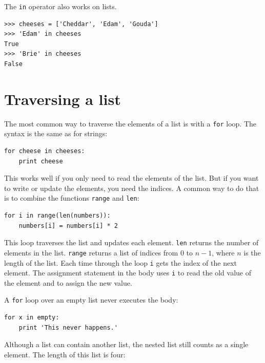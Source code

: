 \documentclass[10pt]{book}
\begin{document}



The {\tt in} operator also works on lists.

\beforeverb
\begin{verbatim}
>>> cheeses = ['Cheddar', 'Edam', 'Gouda']
>>> 'Edam' in cheeses
True
>>> 'Brie' in cheeses
False
\end{verbatim}
\afterverb


\section{Traversing a list}

The most common way to traverse the elements of a list is
with a {\tt for} loop.  The syntax is the same as for strings:

\beforeverb
\begin{verbatim}
for cheese in cheeses:
    print cheese
\end{verbatim}
\afterverb
%
This works well if you only need to read the elements of the
list.  But if you want to write or update the elements, you
need the indices.  A common way to do that is to combine
the functions {\tt range} and {\tt len}:


\beforeverb
\begin{verbatim}
for i in range(len(numbers)):
    numbers[i] = numbers[i] * 2
\end{verbatim}
\afterverb
%
This loop traverses the list and updates each element.  {\tt len}
returns the number of elements in the list.  {\tt range} returns
a list of indices from 0 to $n-1$, where $n$ is the length of
the list.  Each time through the loop {\tt i} gets the index
of the next element.  The assignment statement in the body uses
{\tt i} to read the old value of the element and to assign the
new value.


A {\tt for} loop over an empty list never executes the body:

\beforeverb
\begin{verbatim}
for x in empty:
    print 'This never happens.'
\end{verbatim}
\afterverb
%
Although a list can contain another list, the nested
list still counts as a single element.  The length of this list is
four:
\end{document}
